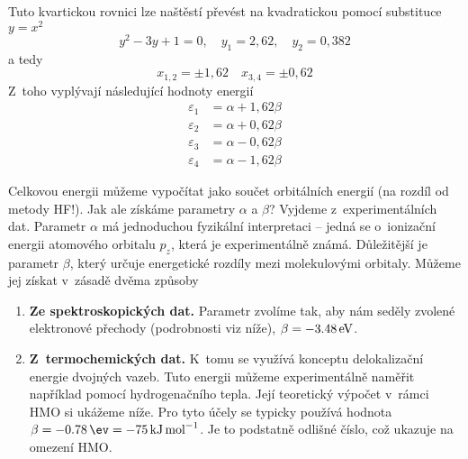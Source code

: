 Tuto kvartickou rovnici lze naštěstí převést na kvadratickou pomocí substituce $y=x^2$
\begin{equation}
y^2-3y+1=0,\quad y_1=2{,}62,\quad y_2=0{,}382 
\end{equation}
a tedy
\begin{equation}
x_{1,2}=\pm 1{,}62 \quad
x_{3,4}=\pm 0{,}62
\end{equation}
Z~toho vyplývají následující hodnoty energií
\begin{equation}
\begin{split}
\varepsilon_1 &= \alpha+1{,}62\beta \\
\varepsilon_2 &= \alpha+0{,}62\beta \\
\varepsilon_3 &= \alpha-0{,}62\beta \\
\varepsilon_4 & = \alpha-1{,}62\beta 
\end{split}
\label{rov:HM2}
\end{equation}

Celkovou energii můžeme vypočítat jako součet orbitálních energií (na rozdíl od metody HF!).
Jak ale získáme parametry $\alpha$ a $\beta$? Vyjdeme z~experimentálních dat. Parametr $\alpha$ má jednoduchou fyzikální interpretaci -- jedná se o~ionizační energii atomového orbitalu $p_z$, která je experimentálně známá. Důležitější je parametr $\beta$, který určuje energetické rozdíly mezi molekulovými orbitaly. Můžeme jej získat v~zásadě dvěma způsoby
\begin{enumerate}
\item \textbf{Ze spektroskopických dat.} Parametr zvolíme tak, aby nám seděly zvolené elektronové přechody (podrobnosti viz níže), $\beta = \SI{-3{,}48}{\eV}$.
\item \textbf{Z~termochemických dat.} K~tomu se využívá konceptu delokalizační energie dvojných vazeb. Tuto energii můžeme experimentálně naměřit například pomocí hydrogenačního tepla. Její teoretický výpočet v~rámci HMO si ukážeme níže. Pro tyto účely se typicky používá hodnota $\beta = \SI{-0{,}78}{\ev} = \SI{-75}{\kJ\per\mol}$. Je to podstatně odlišné číslo, což ukazuje na omezení HMO.
\end{enumerate}


